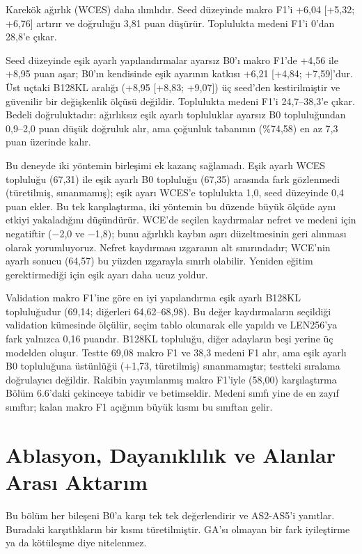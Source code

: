 \documentclass[11pt]{article}
\begin{document}
Karekök ağırlık (WCES) daha ılımlıdır. Seed düzeyinde makro F1'i +6,04 [+5,32; +6,76] artırır ve doğruluğu 3,81 puan düşürür. Toplulukta medeni F1'i 0'dan 28,8'e çıkar.

Seed düzeyinde eşik ayarlı yapılandırmalar ayarsız B0'ı makro F1'de +4,56 ile +8,95 puan aşar; B0'ın kendisinde eşik ayarının katkısı +6,21 [+4,84; +7,59]'dur. Üst uçtaki B128KL aralığı (+8,95 [+8,83; +9,07]) üç seed'den kestirilmiştir ve güvenilir bir değişkenlik ölçüsü değildir. Toplulukta medeni F1'i 24,7–38,3'e çıkar. Bedeli doğruluktadır: ağırlıksız eşik ayarlı topluluklar ayarsız B0 topluluğundan 0,9–2,0 puan düşük doğruluk alır, ama çoğunluk tabanının (\%74,58) en az 7,3 puan üzerinde kalır.

Bu deneyde iki yöntemin birleşimi ek kazanç sağlamadı. Eşik ayarlı WCES topluluğu (67,31) ile eşik ayarlı B0 topluluğu (67,35) arasında fark gözlenmedi (türetilmiş, sınanmamış); eşik ayarı WCES'e toplulukta 1,0, seed düzeyinde 0,4 puan ekler. Bu tek karşılaştırma, iki yöntemin bu düzende büyük ölçüde aynı etkiyi yakaladığını düşündürür. WCE'de seçilen kaydırmalar nefret ve medeni için negatiftir ($-$2,0 ve $-$1,8); bunu ağırlıklı kaybın aşırı düzeltmesinin geri alınması olarak yorumluyoruz. Nefret kaydırması ızgaranın alt sınırındadır; WCE'nin ayarlı sonucu (64,57) bu yüzden ızgarayla sınırlı olabilir. Yeniden eğitim gerektirmediği için eşik ayarı daha ucuz yoldur.

Validation makro F1'ine göre en iyi yapılandırma eşik ayarlı B128KL topluluğudur (69,14; diğerleri 64,62–68,98). Bu değer kaydırmaların seçildiği validation kümesinde ölçülür, seçim tablo okunarak elle yapıldı ve LEN256'ya fark yalnızca 0,16 puandır. B128KL topluluğu, diğer adayların beşi yerine üç modelden oluşur. Testte 69,08 makro F1 ve 38,3 medeni F1 alır, ama eşik ayarlı B0 topluluğuna üstünlüğü (+1,73, türetilmiş) sınanmamıştır; testteki sıralama doğrulayıcı değildir. Rakibin yayımlanmış makro F1'iyle (58,00) karşılaştırma Bölüm 6.6'daki çekinceye tabidir ve betimseldir. Medeni sınıfı yine de en zayıf sınıftır; kalan makro F1 açığının büyük kısmı bu sınıftan gelir.

\section{Ablasyon, Dayanıklılık ve Alanlar Arası Aktarım}\label{sec:7}

Bu bölüm her bileşeni B0'a karşı tek tek değerlendirir ve AS2-AS5'i yanıtlar. Buradaki karşıtlıkların bir kısmı türetilmiştir. GA'sı olmayan bir fark iyileştirme ya da kötüleşme diye nitelenmez.
\end{document}
